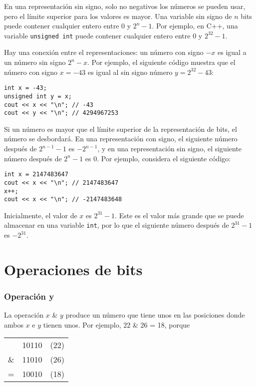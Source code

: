 En una representación sin signo, solo no negativos
los números se pueden usar, pero el límite superior para los valores es mayor.
Una variable sin signo de $n$ bits puede contener cualquier
entero entre $0$ y $2^n-1$.
Por ejemplo, en C++, una variable \texttt{unsigned int}
puede contener cualquier entero entre $0$ y $2^{32}-1$.

Hay una conexión entre el
representaciones:
un número con signo $-x$ es igual a un número sin signo $2^n-x$.
Por ejemplo, el siguiente código muestra que
el número con signo $x=-43$ es igual al sin signo
número $y=2^{32}-43$:
\begin{lstlisting}
int x = -43;
unsigned int y = x;
cout << x << "\n"; // -43
cout << y << "\n"; // 4294967253
\end{lstlisting}

Si un número es mayor que el límite superior
de la representación de bits, el número se desbordará.
En una representación con signo,
el siguiente número después de $2^{n-1}-1$ es $-2^{n-1}$,
y en una representación sin signo,
el siguiente número después de $2^n-1$ es $0$.
Por ejemplo, considera el siguiente código:
\begin{lstlisting}
int x = 2147483647
cout << x << "\n"; // 2147483647
x++;
cout << x << "\n"; // -2147483648
\end{lstlisting}

Inicialmente, el valor de $x$ es $2^{31}-1$.
Este es el valor más grande que se puede almacenar
en una variable \texttt{int},
por lo que el siguiente número después de $2^{31}-1$ es $-2^{31}$.


\section{Operaciones de bits}

\newcommand\XOR{\mathbin{\char`\^}}

\subsubsection{Operación y}


La operación  $x$ \& $y$ produce un número
que tiene unos en las posiciones donde ambos
$x$ e $y$ tienen unos.
Por ejemplo, $22$ \& $26$ = 18, porque

\begin{center}
\begin{tabular}{rrr}
& 10110 & (22)\\
\& & 11010 & (26) \\
\hline
 = & 10010 & (18) \\
\end{tabular}
\end{center}

